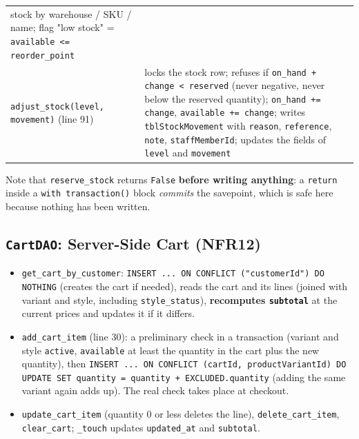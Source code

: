 {\begin{longtable}{@{}
  >{\raggedright\arraybackslash}p{}
  >{\raggedright\arraybackslash}p{}@{}}
stock by warehouse / SKU / name; flag "low stock" =
\texttt{available \textless{}=\allowbreak{} reorder\_\allowbreak{}point} \\
\texttt{adjust\_\allowbreak{}stock(\allowbreak{}level,\allowbreak{} movement)} (line 91) & locks the stock
row; refuses if \texttt{on\_\allowbreak{}hand + change \textless{} reserved}
(never negative, never below the reserved quantity);
\texttt{on\_\allowbreak{}hand +=\allowbreak{} change}, \texttt{available +=\allowbreak{} change}; writes
\texttt{tblStockMovement} with \texttt{reason}, \texttt{reference},
\texttt{note}, \texttt{staffMemberId}; updates the fields of
\texttt{level} and \texttt{movement} \\
\end{longtable}}

Note that \texttt{reserve\_\allowbreak{}stock} returns \texttt{False} \textbf{before
writing anything}: a \texttt{return} inside a
\texttt{with transaction(\allowbreak{})} block \emph{commits} the savepoint, which
is safe here because nothing has been written.

\hypertarget{cartdao-server-side-cart-nfr12}{%
\subsection{\texorpdfstring{\texttt{CartDAO}: Server-Side Cart
(NFR12)}{CartDAO: Server-Side Cart (NFR12)}}\label{cartdao-server-side-cart-nfr12}}

\begin{itemize}
\tightlist
\item
  \texttt{get\_\allowbreak{}cart\_\allowbreak{}by\_\allowbreak{}customer}:
  \texttt{INSERT .\allowbreak{}.\allowbreak{}.\allowbreak{} ON CONFLICT (\allowbreak{}"customerId") DO NOTHING}
  (creates the cart if needed), reads the cart and its lines (joined
  with variant and style, including \texttt{style\_\allowbreak{}status}),
  \textbf{recomputes \texttt{subtotal}} at the current prices and
  updates it if it differs.
\item
  \texttt{add\_\allowbreak{}cart\_\allowbreak{}item} (line 30): a preliminary check in a
  transaction (variant and style \texttt{active}, \texttt{available} at
  least the quantity in the cart plus the new quantity), then
  \texttt{INSERT .\allowbreak{}.\allowbreak{}.\allowbreak{} ON CONFLICT (\allowbreak{}cartId,\allowbreak{} productVariantId) DO UPDATE SET quantity =\allowbreak{} quantity + EXCLUDED.\allowbreak{}quantity}
  (adding the same variant again adds up). The real check takes place at
  checkout.
\item
  \texttt{update\_\allowbreak{}cart\_\allowbreak{}item} (quantity 0 or less deletes the line),
  \texttt{delete\_\allowbreak{}cart\_\allowbreak{}item}, \texttt{clear\_\allowbreak{}cart}; \texttt{\_\allowbreak{}touch}
  updates \texttt{updated\_\allowbreak{}at} and \texttt{subtotal}.
\end{itemize}

